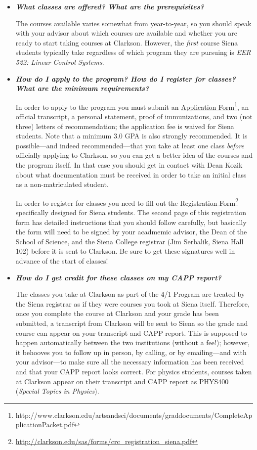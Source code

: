 \documentclass[12pt]{article}
\begin{document}
\begin{itemize}
\item{{\bf {\em What classes are offered?  What are the prerequisites?}}

The courses available varies somewhat from year-to-year, so you should speak
with your advisor about which courses are available and whether you are ready to
start taking courses at Clarkson.  However, the \emph{first} course Siena
students typically take regardless of which program they are pursuing is {\em
  EER 522: Linear Control Systems}.}

\item{{\bf {\em How do I apply to the program?  How do I register for classes?
      What are the minimum requirements?}}

In order to apply to the program you must submit an \underline{Application
  Form}\footnote{http://www.clarkson.edu/artsandsci/documents/graddocuments/CompleteApplicationPacket.pdf},
an official transcript, a personal statement, proof of immunizations, and two
(not three) letters of recommendation; the application fee is waived for Siena
students.  Note that a minimum 3.0 GPA is also strongly recommended.  It is
possible---and indeed recommended---that you take at least one class
\emph{before} officially applying to Clarkson, so you can get a better idea of
the courses and the program itself.  In that case you should get in contact with
Dean Kozik about what documentation must be received in order to take an initial
class as a non-matriculated student.

In order to register for classes you need to fill out the
\underline{Registration
  Form}\footnote{\url{http://clarkson.edu/sas/forms/crc_registration_siena.pdf}}
specifically designed for Siena students.  The second page of this registration
form has detailed instructions that you should follow carefully, but basically
the form will need to be signed by your acadmemic advisor, the Dean of the
School of Science, and the Siena College registrar (Jim Serbalik, Siena Hall
102) before it is sent to Clarkson.  Be sure to get these signatures well in
advance of the start of classes!}

\item{{\bf {\em How do I get credit for these classes on my CAPP report?}}

The classes you take at Clarkson as part of the 4/1 Program are treated by the
Siena registrar as if they were courses you took at Siena itself.  Therefore,
once you complete the course at Clarkson and your grade has been submitted, a
transcript from Clarkson will be sent to Siena so the grade and course can
appear on your transcript and CAPP report.  This is supposed to happen
automatically between the two institutions (without a fee!); however, it
behooves you to follow up in person, by calling, or by emailing---and with your
advisor---to make sure all the necessary information has been received and that
your CAPP report looks correct.  For physics students, courses taken at Clarkson
appear on their transcript and CAPP report as PHYS400 ({\em Special Topics in
  Physics}).}


\end{itemize}
\end{document}
